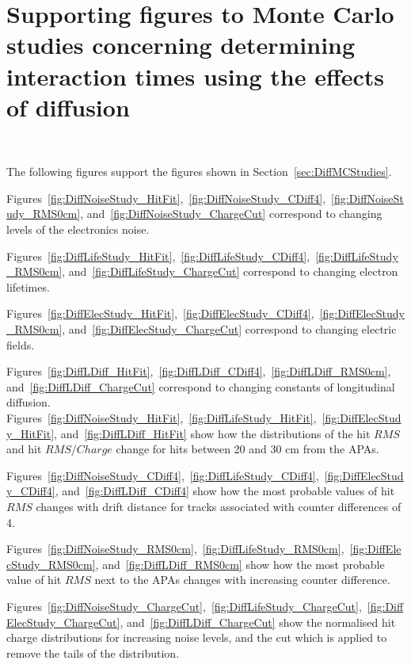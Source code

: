 \chapter{Supporting figures to Monte Carlo studies concerning determining interaction times using the effects of diffusion} ~\label{sec:DiffMCPlots}

\graphicspath{{Appendix1/Figs/PDF/}{Appendix1/Figs/Raster/}{Appendix1/Figs/Vector/}}

The following figures support the figures shown in Section~\ref{sec:DiffMCStudies}.

Figures~\ref{fig:DiffNoiseStudy_HitFit},~\ref{fig:DiffNoiseStudy_CDiff4},~\ref{fig:DiffNoiseStudy_RMS0cm}, and~\ref{fig:DiffNoiseStudy_ChargeCut} correspond to changing levels of the electronics noise.

Figures~\ref{fig:DiffLifeStudy_HitFit},~\ref{fig:DiffLifeStudy_CDiff4},~\ref{fig:DiffLifeStudy_RMS0cm}, and~\ref{fig:DiffLifeStudy_ChargeCut} correspond to changing electron lifetimes.

Figures~\ref{fig:DiffElecStudy_HitFit},~\ref{fig:DiffElecStudy_CDiff4},~\ref{fig:DiffElecStudy_RMS0cm}, and~\ref{fig:DiffElecStudy_ChargeCut} correspond to changing electric fields.

Figures~\ref{fig:DiffLDiff_HitFit},~\ref{fig:DiffLDiff_CDiff4},~\ref{fig:DiffLDiff_RMS0cm}, and~\ref{fig:DiffLDiff_ChargeCut} correspond to changing constants of longitudinal diffusion. \\

Figures~\ref{fig:DiffNoiseStudy_HitFit},~\ref{fig:DiffLifeStudy_HitFit},~\ref{fig:DiffElecStudy_HitFit}, and~\ref{fig:DiffLDiff_HitFit} show how the distributions of the hit $RMS$ and hit $RMS/Charge$ change for hits between 20 and 30 cm from the APAs.

Figures~\ref{fig:DiffNoiseStudy_CDiff4},~\ref{fig:DiffLifeStudy_CDiff4},~\ref{fig:DiffElecStudy_CDiff4}, and~\ref{fig:DiffLDiff_CDiff4} show how the most probable values of hit $RMS$ changes with drift distance for tracks associated with counter differences of 4.

Figures~\ref{fig:DiffNoiseStudy_RMS0cm},~\ref{fig:DiffLifeStudy_RMS0cm},~\ref{fig:DiffElecStudy_RMS0cm}, and~\ref{fig:DiffLDiff_RMS0cm} show how the most probable value of hit $RMS$ next to the APAs changes with increasing counter difference.

Figures~\ref{fig:DiffNoiseStudy_ChargeCut},~\ref{fig:DiffLifeStudy_ChargeCut},~\ref{fig:DiffElecStudy_ChargeCut}, and~\ref{fig:DiffLDiff_ChargeCut} show the normalised hit charge distributions for increasing noise levels, and the cut which is applied to remove the tails of the distribution. \\ 

